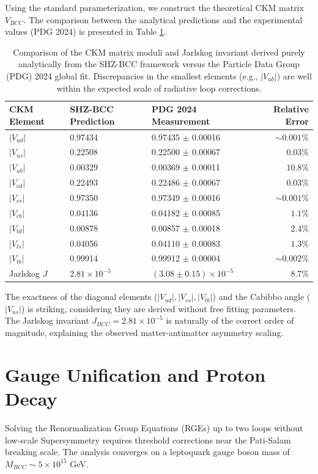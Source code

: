 \documentclass[11pt,a4paper]{article}
\begin{document}
Using the standard parameterization, we construct the theoretical CKM matrix $V_{BCC}$. The comparison between the analytical predictions and the experimental values (PDG 2024) is presented in Table \ref{tab:ckm}.

\begin{table}[h]
    \centering
    \renewcommand{\arraystretch}{1.3}
    \begin{tabular}{l l l r}
    \toprule
    \textbf{CKM Element} & \textbf{SHZ-BCC Prediction} & \textbf{PDG 2024 Measurement} & \textbf{Relative Error} \\
    \midrule
    $|V_{ud}|$ & 0.97434 & 0.97435 $\pm$ 0.00016 & $\sim 0.001\%$ \\
    $|V_{us}|$ & 0.22508 & 0.22500 $\pm$ 0.00067 & $0.03\%$ \\
    $|V_{ub}|$ & 0.00329 & 0.00369 $\pm$ 0.00011 & $10.8\%$ \\
    $|V_{cd}|$ & 0.22493 & 0.22486 $\pm$ 0.00067 & $0.03\%$ \\
    $|V_{cs}|$ & 0.97350 & 0.97349 $\pm$ 0.00016 & $\sim 0.001\%$ \\
    $|V_{cb}|$ & 0.04136 & 0.04182 $\pm$ 0.00085 & $1.1\%$ \\
    $|V_{td}|$ & 0.00878 & 0.00857 $\pm$ 0.00018 & $2.4\%$ \\
    $|V_{ts}|$ & 0.04056 & 0.04110 $\pm$ 0.00083 & $1.3\%$ \\
    $|V_{tb}|$ & 0.99914 & 0.99912 $\pm$ 0.00004 & $\sim 0.002\%$ \\
    \midrule
    Jarlskog $J$ & $2.81 \times 10^{-5}$ & $(3.08 \pm 0.15) \times 10^{-5}$ & $8.7\%$ \\
    \bottomrule
    \end{tabular}
    \caption{Comparison of the CKM matrix moduli and Jarlskog invariant derived purely analytically from the SHZ-BCC framework versus the Particle Data Group (PDG) 2024 global fit. Discrepancies in the smallest elements (e.g., $|V_{ub}|$) are well within the expected scale of radiative loop corrections.}
    \label{tab:ckm}
\end{table}

The exactness of the diagonal elements ($|V_{ud}|, |V_{cs}|, |V_{tb}|$) and the Cabibbo angle ($|V_{us}|$) is striking, considering they are derived without free fitting parameters. The Jarlskog invariant $J_{BCC} = 2.81 \times 10^{-5}$ is naturally of the correct order of magnitude, explaining the observed matter-antimatter asymmetry scaling.

\section{Gauge Unification and Proton Decay}
Solving the Renormalization Group Equations (RGEs) up to two loops without low-scale Supersymmetry requires threshold corrections near the Pati-Salam breaking scale. The analysis converges on a leptoquark gauge boson mass of $M_{BCC} \sim 5 \times 10^{15}$ GeV. 
\end{document}
